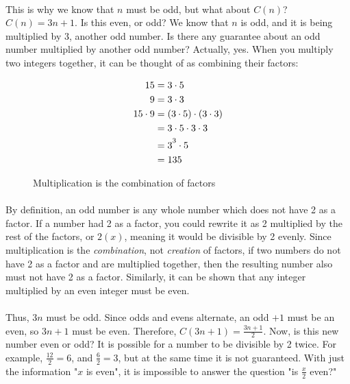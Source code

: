 \documentclass[12pt,letterpaper]{article}
\begin{document}
			\paragraph{} This is why we know that $n$ must be odd, but what about $C(n)$? $C(n) = 3n + 1$. Is this even, or odd? We know that $n$ is odd, and it is being multiplied by $3$, another odd number. Is there any guarantee about an odd number multiplied by another odd number? Actually, yes. When you multiply two integers together, it can be thought of as combining their factors:
			
			\begin{figure}[h]
				\begin{align*}
					15 &= 3 \cdot 5\\
					9 &= 3 \cdot 3\\
					15 \cdot 9 &= (3 \cdot 5) \cdot (3 \cdot 3)\\
					&= 3 \cdot 5 \cdot 3 \cdot 3 \\
					&= 3\strut^3 \cdot 5\\
					&= 135
				\end{align*}
				
				\caption{Multiplication is the combination of factors}
				\label{fig:multiplication}
			\end{figure}
		
			\paragraph{} By definition, an odd number is any whole number which does not have 2 as a factor. If a number had 2 as a factor, you could rewrite it as 2 multiplied by the rest of the factors, or $2(x)$, meaning it would be divisible by 2 evenly. Since multiplication is the \textit{combination}, not \textit{creation} of factors, if two numbers do not have 2 as a factor and are multiplied together, then the resulting number also must not have 2 as a factor. Similarly, it can be shown that any integer multiplied by an even integer must be even.
			
			\paragraph{} Thus, $3n$ must be odd. Since odds and evens alternate, an odd $+ 1$ must be an even, so $3n + 1$ must be even. Therefore, $C(3n + 1) = \frac{3n + 1}{2}$. Now, is this new number even or odd? It is possible for a number to be divisible by 2 twice. For example, $\frac{12}{2} = 6$, and $\frac{6}{2} = 3$, but at the same time it is not guaranteed. With just the information "$x$ is even", it is impossible to answer the question "is $\frac{x}{2}$ even?"
			
\end{document}
